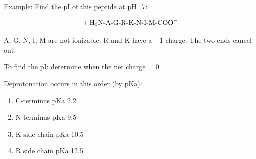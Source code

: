 \documentclass[letterpaper, 12pt]{article}
\begin{document}
Example: Find the pI of this peptide at pH=7:

$$\ce{+H3N}\text{-A-G-R-K-N-I-M-}\ce{COO-}$$

A, G, N, I, M are not ionizable. R and K have a +1 charge. The two ends cancel out.

To find the pI: determine when the net charge = 0.

Deprotonation occurs in this order (by pKa):

\begin{enumerate}
\item C-terminus pKa 2.2
\item N-terminus pKa 9.5
\item K side chain pKa 10.5
\item R side chain pKa 12.5
\end{enumerate}
\end{document}
